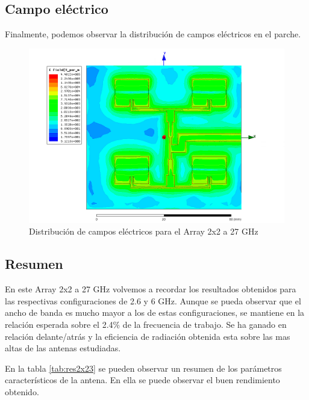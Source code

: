 \newpage
\subsection{Campo eléctrico}
\par Finalmente, podemos observar la distribución de campos eléctricos en el parche. 
\begin{figure}[H]
    \centering
        \includegraphics[width=\textwidth]{archivos/analisis/2x23/8}
        \caption{Distribución de campos eléctricos para el Array 2x2 a 27 GHz}
        \label{fig:elec2x23}
\end{figure}


\subsection{Resumen}
\par En este Array 2x2 a 27 GHz volvemos a recordar los resultados obtenidos para las respectivas configuraciones de 2.6 y 6 GHz. Aunque se pueda observar que el ancho de banda es mucho mayor a los de estas configuraciones, se mantiene en la relación esperada sobre el 2.4\% de la frecuencia de trabajo. Se ha ganado en relación delante/atrás y la eficiencia de radiación obtenida esta sobre las mas altas de las antenas estudiadas. 
\\
\par En la tabla \ref{tab:res2x23} se pueden observar un resumen de los parámetros característicos de la antena. En ella se puede observar el buen rendimiento obtenido.

